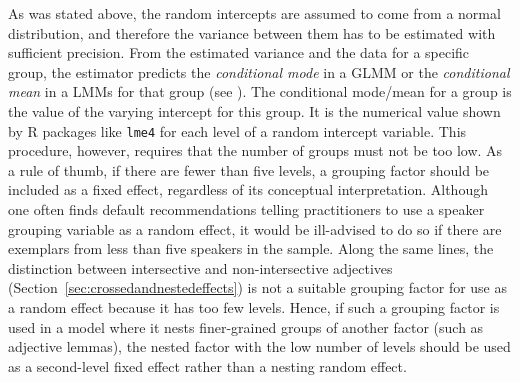 As was stated above, the random intercepts are assumed to come from a normal distribution, and therefore the variance between them has to be estimated with sufficient precision.
From the estimated variance and the data for a specific group, the estimator predicts the \textit{conditional mode} in a GLMM or the \textit{conditional mean} in a LMMs for that group (see \citealt[Ch.~1]{Bates2010}).
The conditional mode\slash mean for a group is the value of the varying intercept for this group.
It is the numerical value shown by R packages like \texttt{lme4} for each level of a random intercept variable.
This procedure, however, requires that the number of groups must not be too low.
As a rule of thumb, if there are fewer than five levels, a grouping factor should be included as a fixed effect, regardless of its conceptual interpretation.
Although one often finds default recommendations telling practitioners to use a speaker grouping variable as a random effect, it would be ill-advised to do so if there are exemplars from less than five speakers in the sample.
Along the same lines, the distinction between intersective and non-intersective adjectives (Section~\ref{sec:crossedandnestedeffects}) is not a suitable grouping factor for use as a random effect because it has too few levels.
Hence, if such a grouping factor is used in a model where it nests finer-grained groups of another factor (such as adjective lemmas), the nested factor with the low number of levels should be used as a second-level fixed effect rather than a nesting random effect.

